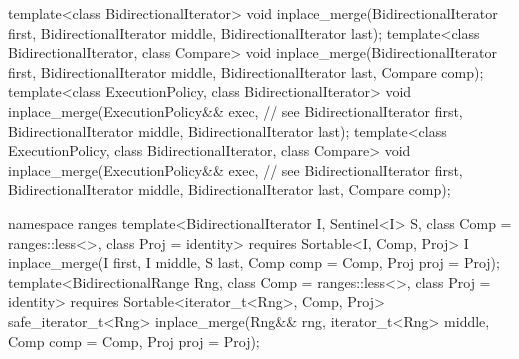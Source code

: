 \begin{codeblock}
  template<class BidirectionalIterator>
    void inplace_merge(BidirectionalIterator first,
                       BidirectionalIterator middle,
                       BidirectionalIterator last);
  template<class BidirectionalIterator, class Compare>
    void inplace_merge(BidirectionalIterator first,
                       BidirectionalIterator middle,
                       BidirectionalIterator last, Compare comp);
  template<class ExecutionPolicy, class BidirectionalIterator>
    void inplace_merge(ExecutionPolicy&& exec, // see 
                       BidirectionalIterator first,
                       BidirectionalIterator middle,
                       BidirectionalIterator last);
  template<class ExecutionPolicy, class BidirectionalIterator, class Compare>
    void inplace_merge(ExecutionPolicy&& exec, // see 
                       BidirectionalIterator first,
                       BidirectionalIterator middle,
                       BidirectionalIterator last, Compare comp);
\end{codeblock}\begin{addedblock}\begin{codeblock}
  namespace ranges {
    template<BidirectionalIterator I, Sentinel<I> S, class Comp = ranges::less<>,
        class Proj = identity>
      requires Sortable<I, Comp, Proj>
      I inplace_merge(I first, I middle, S last, Comp comp = Comp{}, Proj proj = Proj{});
    template<BidirectionalRange Rng, class Comp = ranges::less<>, class Proj = identity>
      requires Sortable<iterator_t<Rng>, Comp, Proj>
      safe_iterator_t<Rng>
        inplace_merge(Rng&& rng, iterator_t<Rng> middle, Comp comp = Comp{},
                      Proj proj = Proj{});
  }
\end{codeblock}\end{addedblock}\begin{codeblock}


\end{codeblock}
